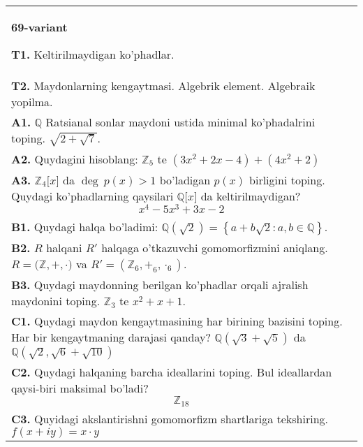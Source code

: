 \documentclass{article}
\begin{document}
\begin{tabular}{m{17cm}}
\textbf{69-variant}
\newline

\textbf{T1.} Keltirilmaydigan ko'phadlar. \\
\textbf{T2.} Maydonlarning kengaytmasi. Algebrik element. Algebraik yopilma. \\
\textbf{A1.} \(\mathbb{Q}\) Ratsianal sonlar maydoni ustida minimal ko'phadalrini toping.
\(\sqrt{2 + \sqrt{7}}\). \\
\textbf{A2.} Quydagini hisoblang:
\(\mathbb{Z}_{5}\) te \(\left( 3x^{2} + 2x - 4 \right) + \left( 4x^{2} + 2 \right)\) \\
\textbf{A3.} \(\mathbb{Z}_{4}\lbrack x\rbrack\) da \(\deg\ p(x) > 1\) bo'ladigan \(p(x)\) birligini toping. Quydagi ko'phadlarning qaysilari \(\mathbb{Q\lbrack}x\rbrack\) da keltirilmaydigan?
\[x^{4} - 5x^{3} + 3x - 2\] \\
\textbf{B1.} Quydagi halqa bo'ladimi:
\(\mathbb{Q}\left( \sqrt{2} \right) = \left\{ a + b\sqrt{2}:a,b \in \mathbb{Q} \right\}\). \\
\textbf{B2.} \(R\) halqani \(R'\) halqaga o'tkazuvchi gomomorfizmini aniqlang.
\(R\mathbb{= (Z,} + , \cdot )\) va \(R' = (\mathbb{Z}_{6}, +_{6}, \cdot_{6})\). \\
\textbf{B3.} Quydagi maydonning berilgan ko'phadlar orqali ajralish maydonini toping.
\(\mathbb{Z}_{3}\) te \(x^{2} + x + 1\). \\
\textbf{C1.} Quydagi maydon kengaytmasining har birining bazisini toping. Har bir kengaytmaning darajasi qanday?
\(\mathbb{Q}\left( \sqrt{3} + \sqrt{5} \right)\) da \(\mathbb{Q}\left( \sqrt{2},\sqrt{6} + \sqrt{10} \right)\) \\
\textbf{C2.} Quydagi halqaning barcha ideallarini toping. Bul ideallardan qaysi-biri maksimal bo'ladi?
\[\mathbb{Z}_{18}\] \\
\textbf{C3.} Quyidagi akslantirishni gomomorfizm shartlariga tekshiring. \(f(x + iy) = x \cdot y\) \\

\end{tabular}
\vspace{1cm}
\end{document}
